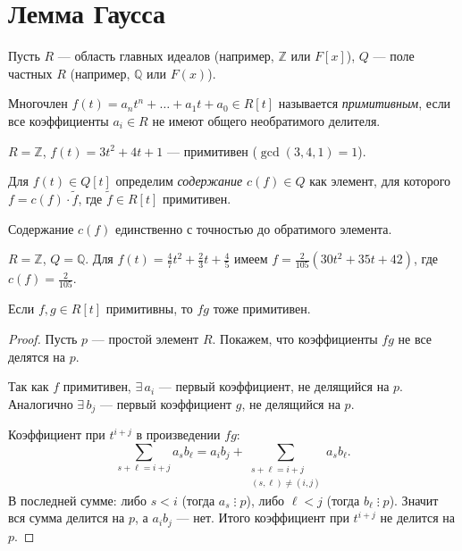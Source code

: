 \section{Лемма Гаусса}

Пусть $R$ --- область главных идеалов (например, $\mathbb{Z}$ или $F[x]$), $Q$ --- поле частных $R$ (например,
$\mathbb{Q}$ или $F(x)$).

\begin{definition}
	Многочлен $f(t) = a_n t^n + \dots + a_1 t + a_0 \in R[t]$ называется \emph{примитивным},
    если все коэффициенты $a_i \in R$ не имеют общего необратимого делителя.
\end{definition}

\begin{example}
	$R = \mathbb{Z}$, $f(t) = 3t^2 + 4t + 1$ --- примитивен ($\gcd(3, 4, 1) = 1$).
\end{example}


\begin{definition}
	Для $f(t) \in Q[t]$ определим \emph{содержание} $c(f) \in Q$ как элемент, для которого $f = c(f) \cdot \tilde{f}$,
    где $\tilde{f} \in R[t]$ примитивен.

	Содержание $c(f)$ единственно с точностью до обратимого элемента.
\end{definition}

\begin{example}
	$R = \mathbb{Z}$, $Q = \mathbb{Q}$. Для $f(t) = \frac{4}{7}t^2 + \frac{2}{3}t + \frac{4}{5}$ имеем
    $f = \frac{2}{105}(30t^2 + 35t + 42)$, где $c(f) = \frac{2}{105}$.
\end{example}


\begin{stmt}
	Если $f, g \in R[t]$ примитивны, то $fg$ тоже примитивен.

	\begin{proof}
		Пусть $p$ --- простой элемент $R$. Покажем, что коэффициенты $fg$ не все делятся на $p$.

		Так как $f$ примитивен, $\exists\, a_i$ --- первый коэффициент, не делящийся на $p$. Аналогично
        $\exists\, b_j$ --- первый коэффициент $g$, не делящийся на $p$.

		Коэффициент при $t^{i+j}$ в произведении $fg$:
		\[
			\sum_{s+\ell = i+j} a_s b_\ell = a_i b_j + \sum_{\substack{s+\ell = i+j \\ (s,\ell) \neq (i,j)}} a_s b_\ell.
		\]
		В последней сумме: либо $s < i$ (тогда $a_s \mathbin{\vdots} p$), либо $\ell < j$ (тогда $b_\ell \mathbin{\vdots} p$).
        Значит вся сумма делится на $p$, а $a_i b_j$ --- нет. Итого коэффициент при $t^{i+j}$ не делится на $p$.
	\end{proof}
\end{stmt}


